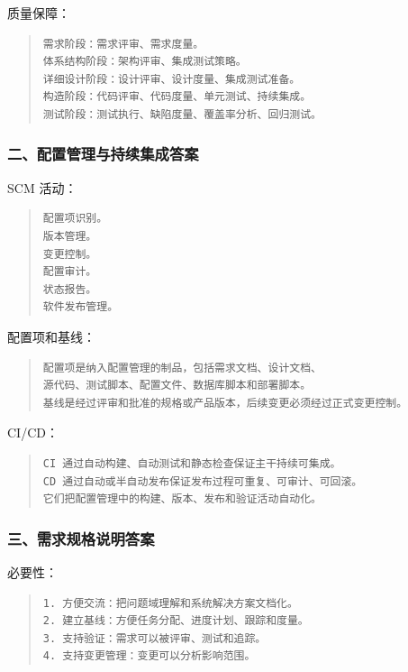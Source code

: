 \documentclass[UTF8,zihao=-4]{ctexart}
\begin{document}
质量保障：


\begin{quote}
\footnotesize
\begin{verbatim}
需求阶段：需求评审、需求度量。
体系结构阶段：架构评审、集成测试策略。
详细设计阶段：设计评审、设计度量、集成测试准备。
构造阶段：代码评审、代码度量、单元测试、持续集成。
测试阶段：测试执行、缺陷度量、覆盖率分析、回归测试。
\end{verbatim}
\end{quote}


\subsubsection*{二、配置管理与持续集成答案}


SCM 活动：


\begin{quote}
\footnotesize
\begin{verbatim}
配置项识别。
版本管理。
变更控制。
配置审计。
状态报告。
软件发布管理。
\end{verbatim}
\end{quote}


配置项和基线：


\begin{quote}
\footnotesize
\begin{verbatim}
配置项是纳入配置管理的制品，包括需求文档、设计文档、
源代码、测试脚本、配置文件、数据库脚本和部署脚本。
基线是经过评审和批准的规格或产品版本，后续变更必须经过正式变更控制。
\end{verbatim}
\end{quote}


CI/CD：


\begin{quote}
\footnotesize
\begin{verbatim}
CI 通过自动构建、自动测试和静态检查保证主干持续可集成。
CD 通过自动或半自动发布保证发布过程可重复、可审计、可回滚。
它们把配置管理中的构建、版本、发布和验证活动自动化。
\end{verbatim}
\end{quote}


\subsubsection*{三、需求规格说明答案}


必要性：


\begin{quote}
\footnotesize
\begin{verbatim}
1. 方便交流：把问题域理解和系统解决方案文档化。
2. 建立基线：方便任务分配、进度计划、跟踪和度量。
3. 支持验证：需求可以被评审、测试和追踪。
4. 支持变更管理：变更可以分析影响范围。
\end{verbatim}
\end{quote}
\end{document}
